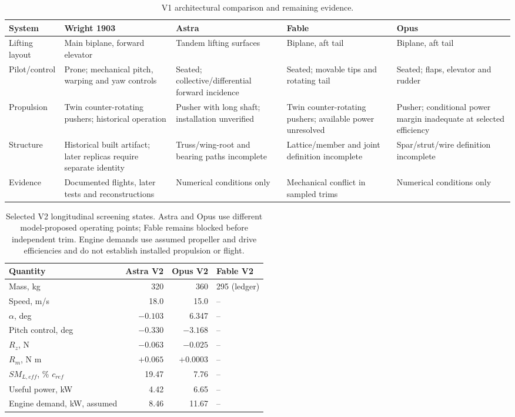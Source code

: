 \documentclass[11pt,a4paper]{article}
\begin{document}
\begin{table}[H]\centering\footnotesize
\caption{V1 architectural comparison and remaining evidence.}\label{tab:architecture}
\begin{tabularx}{\linewidth}{l*{4}{>{\raggedright\arraybackslash}X}}\toprule
System & Wright 1903 & Astra & Fable & Opus\\\midrule
Lifting layout & Main biplane, forward elevator & Tandem lifting surfaces & Biplane, aft tail & Biplane, aft tail\\
Pilot/control & Prone; mechanical pitch, warping and yaw controls & Seated; collective/differential forward incidence & Seated; movable tips and rotating tail & Seated; flaps, elevator and rudder\\
Propulsion & Twin counter-rotating pushers; historical operation & Pusher with long shaft; installation unverified & Twin counter-rotating pushers; available power unresolved & Pusher; conditional power margin inadequate at selected efficiency\\
Structure & Historical built artifact; later replicas require separate identity & Truss/wing-root and bearing paths incomplete & Lattice/member and joint definition incomplete & Spar/strut/wire definition incomplete\\
Evidence & Documented flights, later tests and reconstructions & Numerical conditions only & Mechanical conflict in sampled trims & Numerical conditions only\\\bottomrule
\end{tabularx}
\end{table}

\begin{table}[H]\centering\small
\caption{Selected V2 longitudinal screening states. Astra and Opus use different model-proposed operating points; Fable remains blocked before independent trim. Engine demands use assumed propeller and drive efficiencies and do not establish installed propulsion or flight.}\label{tab:v2}
\begin{tabular}{lrrl}\toprule
Quantity & Astra V2 & Opus V2 & Fable V2\\\midrule
Mass, kg & 320 & 360 & 295 (ledger)\\
Speed, m/s & 18.0 & 15.0 & --\\
$\alpha$, deg & $-0.103$ & 6.347 & --\\
Pitch control, deg & $-0.330$ & $-3.168$ & --\\
$R_z$, N & $-0.063$ & $-0.025$ & --\\
$R_m$, N m & $+0.065$ & $+0.0003$ & --\\
$SM_{L,eff}$, \% $c_{ref}$ & 19.47 & 7.76 & --\\
Useful power, kW & 4.42 & 6.65 & --\\
Engine demand, kW, assumed & 8.46 & 11.67 & --\\\bottomrule
\end{tabular}
\end{table}
\end{document}
